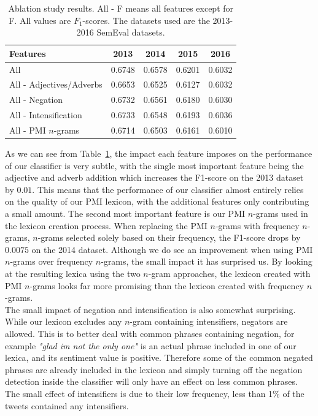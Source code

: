 \begin{table}[t]
    \centering
    \begin{tabular}{|l|c|c|c|c|}
        \hline
        \textbf{Features} & \textbf{2013} & \textbf{2014} & \textbf{2015} & \textbf{2016} \\ \hline
        All                         & 0.6748 & 0.6578 & 0.6201 & 0.6032 \\ \hline
        All - Adjectives/Adverbs    & 0.6653 & 0.6525 & 0.6127 & 0.6032 \\ \hline
        All - Negation              & 0.6732 & 0.6561 & 0.6180 & 0.6030 \\ \hline
        All - Intensification       & 0.6733 & 0.6548 & 0.6193 & 0.6036 \\ \hline
        All - PMI $n$-grams         & 0.6714 & 0.6503 & 0.6161 & 0.6010 \\ \hline
    \end{tabular}
    \caption[Ablation study results for lexicon classifier]{Ablation study results. All - F means all features except for F. All values are $F_1$-scores. The datasets used are the 2013-2016 SemEval datasets.}
    \label{tab:ablation_study_lexicon_classifier}   
\end{table}

As we can see from Table~\ref{tab:ablation_study_lexicon_classifier}, the impact each feature imposes on the performance of our classifier is very subtle, with the single most important feature being the adjective and adverb addition which increases the F1-score on the 2013 dataset by $0.01$. This means that the performance of our classifier almost entirely relies on the quality of our PMI lexicon, with the additional features only contributing a small amount. The second most important feature is our PMI $n$-grams used in the lexicon creation process. When replacing the PMI $n$-grams with frequency $n$-grams, $n$-grams selected solely based on their frequency, the F1-score drops by $0.0075$ on the 2014 dataset. Although we do see an improvement when using PMI $n$-grams over frequency $n$-grams, the small impact it has surprised us. By looking at the resulting lexica using the two $n$-gram approaches, the lexicon created with PMI $n$-grams looks far more promising than the lexicon created with frequency $n$-grams. \\

The small impact of negation and intensification is also somewhat surprising. While our lexicon excludes any $n$-gram containing intensifiers, negators are allowed. This is to better deal with common phrases containing negation, for example \textit{"glad im not the only one"} is an actual phrase included in one of our lexica, and its sentiment value is positive. Therefore some of the common negated phrases are already included in the lexicon and simply turning off the negation detection inside the classifier will only have an effect on less common phrases. The small effect of intensifiers is due to their low frequency, less than 1\% of the tweets contained any intensifiers.

\glsresetall

